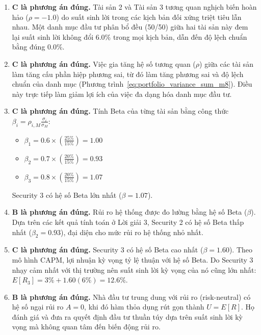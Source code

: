 \begin{enumerate}
	\item \textbf{C là phương án đúng.} Tài sản 2 và Tài sản 3 tương quan nghịch biến hoàn hảo ($\rho = -1.0$) do suất sinh lời trong các kịch bản đối xứng triệt tiêu lẫn nhau. Một danh mục đầu tư phân bổ đều (50/50) giữa hai tài sản này đem lại suất sinh lời không đổi $6.0\%$ trong mọi kịch bản, dẫn đến độ lệch chuẩn bằng đúng 0.0\%.
	
	\item \textbf{C là phương án đúng.} Việc gia tăng hệ số tương quan ($\rho$) giữa các tài sản làm tăng cấu phần hiệp phương sai, từ đó làm tăng phương sai và độ lệch chuẩn của danh mục (Phương trình~\ref{eq:portfolio_variance_sum_m8}). Điều này trực tiếp làm giảm lợi ích của việc đa dạng hóa danh mục đầu tư.
	
	\item \textbf{C là phương án đúng.} Tính Beta của từng tài sản bằng công thức $\beta_i = \rho_{i,M} \frac{\sigma_i}{\sigma_M}$:
	      \begin{itemize}
		      \item $\beta_1 = 0.6 \times \left(\frac{25\%}{15\%}\right) = 1.00$
		      \item $\beta_2 = 0.7 \times \left(\frac{20\%}{15\%}\right) = 0.93$
		      \item $\beta_3 = 0.8 \times \left(\frac{20\%}{15\%}\right) = 1.07$
	      \end{itemize}
	      Security 3 có hệ số Beta lớn nhất ($\beta = 1.07$).
	      
	\item \textbf{B là phương án đúng.} Rủi ro hệ thống được đo lường bằng hệ số Beta ($\beta$). Dựa trên các kết quả tính toán ở Lời giải 3, Security 2 có hệ số Beta thấp nhất ($\beta_2 = 0.93$), đại diện cho mức rủi ro hệ thống nhỏ nhất.
	
	\item \textbf{C là phương án đúng.} Security 3 có hệ số Beta cao nhất ($\beta = 1.60$). Theo mô hình CAPM, lợi nhuận kỳ vọng tỷ lệ thuận với hệ số Beta. Do Security 3 nhạy cảm nhất với thị trường nên suất sinh lời kỳ vọng của nó cũng lớn nhất: $E[R_3] = 3\% + 1.60(6\%) = 12.6\%$.
	
	\item \textbf{B là phương án đúng.} Nhà đầu tư trung dung với rủi ro (risk-neutral) có hệ số ngại rủi ro $A = 0$, khi đó hàm thỏa dụng rút gọn thành $U = E[R]$. Họ đánh giá và đưa ra quyết định đầu tư thuần túy dựa trên suất sinh lời kỳ vọng mà không quan tâm đến biến động rủi ro.
	

\end{enumerate}
